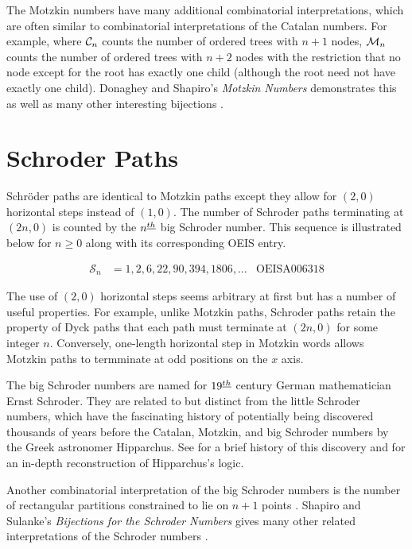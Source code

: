 The Motzkin numbers have many additional combinatorial interpretations, which are often similar to combinatorial interpretations of the Catalan numbers.  For example, where $\mathcal{C}_n$ counts the number of ordered trees with $n+1$ nodes, $\mathcal{M}_n$ counts the number of ordered trees with $n+2$ nodes with the restriction that no node except for the root has exactly one child (although the root need not have exactly one child). Donaghey and Shapiro's \emph{Motzkin Numbers} demonstrates this as well as many other interesting bijections \cite{donaghey1977motzkin}.

\section{Schroder Paths}\label{sec:schroder}

Schröder paths are identical to Motzkin paths except they allow for $(2,0)$ horizontal steps instead of $(1,0)$.  The number of Schroder paths terminating at $(2n,0)$ is counted by the $n^{\underline{th}}$ big Schroder number.  This sequence is illustrated below for $n \ge 0$ along with its corresponding OEIS entry.

\begin{align}
\mathcal{S}_n &= 1, 2, 6, 22, 90, 394, 1806, \ldots & \text{OEIS} \text{A}006318
\end{align}

The use of $(2,0)$ horizontal steps seems arbitrary at first but has a number of useful properties.  For example, unlike Motzkin paths, Schroder paths retain the property of Dyck paths that each path must terminate at $(2n,0)$ for some integer $n$.  Conversely, one-length horizontal step in Motzkin words allows Motzkin paths to termminate at odd positions on the $x$ axis.  

The big Schroder numbers are named for $19^{\underline{th}}$ century German mathematician Ernst Schroder.  They are related to but distinct from the little Schroder numbers, which have the fascinating history of potentially being discovered thousands of years before the Catalan, Motzkin, and big Schroder numbers by the Greek astronomer Hipparchus.  See \cite{stanley1997hipparchus} for a brief history of this discovery and \cite{bobzien2011combinatorics} for an in-depth reconstruction of Hipparchus's logic. 

Another combinatorial interpretation of the big Schroder numbers is the number of rectangular partitions constrained to lie on $n+1$ points \cite{ackerman2004number}.  Shapiro and Sulanke's \emph{Bijections for the Schroder Numbers} gives many other related interpretations of the Schroder numbers \cite{shapiro2000bijections}.

